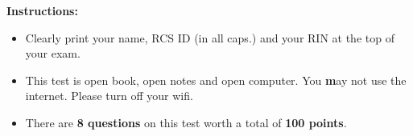 \documentclass[10pt]{article}
\begin{document}
\vspace*{.45in} 

{\large\bf Instructions:}
\begin{itemize}
\item Clearly print your name, RCS ID (in all caps.) and your RIN at the top of your exam.
\item This test is open book, open notes and open computer. You {\textbf may not} use the internet. Please turn off your wifi.
\item There are \textbf{8 questions} on this test worth a total of
  \textbf{100 points}.
\end{itemize}

\end{document}
